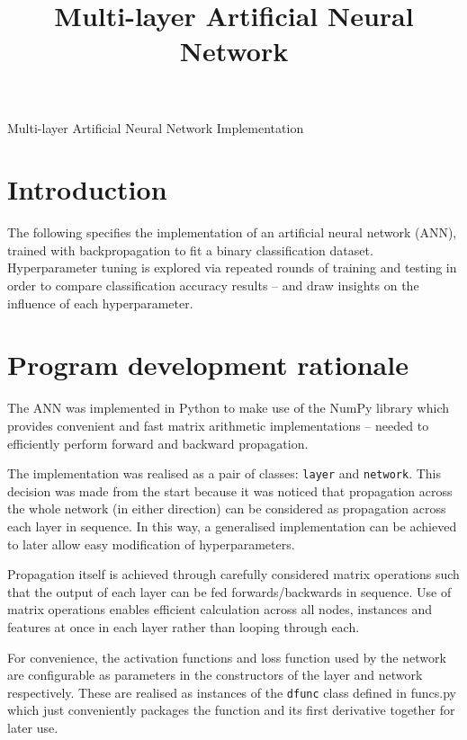 \documentclass[12pt]{article}
\begin{document}
\title{Multi-layer Artificial Neural Network}

\begin{center}
  \Large{Multi-layer Artificial Neural Network Implementation}
\end{center}

\vspace{-2em}
\section{Introduction}
\vspace{-1.5em}

The following specifies the implementation of an artificial neural
network (ANN), trained with backpropagation to fit a binary classification
dataset. Hyperparameter tuning is explored via repeated rounds of
training and testing in order to compare classification accuracy results
-- and draw insights on the influence of each hyperparameter.

\vspace{-1.5em}
\section{Program development rationale}
\vspace{-1.5em}

The ANN was implemented in Python to make use of the NumPy library which
provides convenient and fast matrix arithmetic implementations --
needed to efficiently perform forward and backward propagation.

The implementation was realised as a pair of classes: \texttt{layer}
and \texttt{network}. This decision was made from the start because
it was noticed that propagation across the whole network (in either
direction) can be considered as propagation across each layer in sequence.
In this way, a generalised implementation can be achieved to later allow
easy modification of hyperparameters.

Propagation itself is achieved through carefully considered matrix
operations such that the output of each layer can be fed
forwards/backwards in sequence. Use of matrix operations enables
efficient calculation across all nodes, instances and features at once
in each layer rather than looping through each.

For convenience, the activation functions and loss function used by the
network are configurable as parameters in the constructors of the layer
and network respectively. These are realised as instances of the
\texttt{dfunc} class defined in funcs.py which just conveniently
packages the function and its first derivative together for later use.
\end{document}
